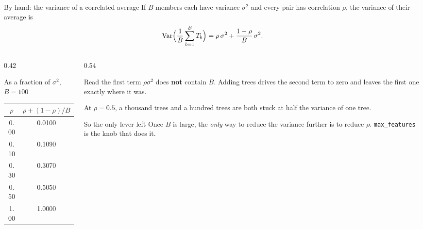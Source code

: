 \documentclass[aspectratio=169]{beamer}
\begin{document}
\begin{frame}[shrink=10]{By hand: the variance of a correlated average}
  If $B$ members each have variance $\sigma^2$ and every pair has correlation
  $\rho$, the variance of their average is
  \[
    \operatorname{Var}\Bigl(\frac{1}{B}\sum_{b=1}^{B} T_b\Bigr)
      = \rho\,\sigma^2 + \frac{1-\rho}{B}\,\sigma^2.
  \]
  \begin{columns}[T]
    \begin{column}{0.42\textwidth}
      \begin{block}{As a fraction of $\sigma^2$, $B = 100$}
        \small
        \begin{tabular}{cc}
          \toprule
          $\rho$ & $\rho + (1-\rho)/B$ \\
          \midrule
          0.00 & 0.0100 \\
          0.10 & 0.1090 \\
          0.30 & 0.3070 \\
          0.50 & 0.5050 \\
          1.00 & 1.0000 \\
          \bottomrule
        \end{tabular}
      \end{block}
    \end{column}
    \begin{column}{0.54\textwidth}
      \begin{alertblock}{Read the first term}
        $\rho\sigma^2$ does \textbf{not} contain $B$. Adding trees drives the
        second term to zero and leaves the first one exactly where it was.

        \smallskip
        At $\rho = 0.5$, a thousand trees and a hundred trees are both stuck
        at half the variance of one tree.
      \end{alertblock}
      \begin{exampleblock}{So the only lever left}
        Once $B$ is large, the \emph{only} way to reduce the variance further
        is to reduce $\rho$. \texttt{max\_features} is the knob that does it.
      \end{exampleblock}
    \end{column}
  \end{columns}
\end{frame}
\end{document}
